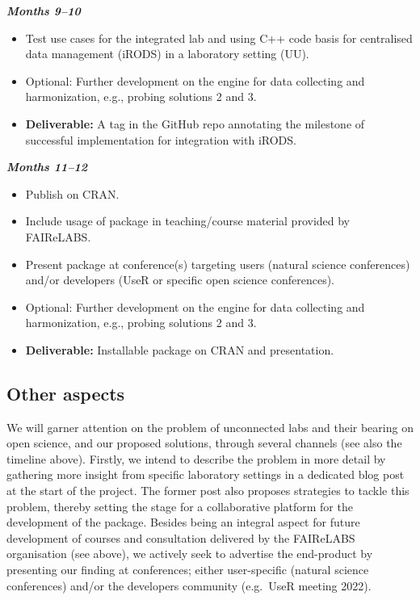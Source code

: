 \documentclass[]{article}
\providecommand{\tightlist}{%
  \setlength{\itemsep}{0pt}\setlength{\parskip}{0pt}}
\begin{document}
\textbf{\emph{Months 9--10}}

\begin{itemize}
\tightlist
\item
  Test use cases for the integrated lab and using C++ code basis for centralised data management (iRODS) in a laboratory setting (UU).
\item
  Optional: Further development on the engine for data collecting and harmonization, e.g., probing solutions 2 and 3.
\item
  \textbf{Deliverable:} A tag in the GitHub repo annotating the milestone of successful implementation for integration with iRODS.
\end{itemize}

\textbf{\emph{Months 11--12}}

\begin{itemize}
\tightlist
\item
  Publish on CRAN.
\item
  Include usage of package in teaching/course material provided by FAIReLABS.
\item
  Present package at conference(s) targeting users (natural science conferences) and/or developers (UseR or specific open science conferences).
\item
  Optional: Further development on the engine for data collecting and harmonization, e.g., probing solutions 2 and 3.
\item
  \textbf{Deliverable:} Installable package on CRAN and presentation.
\end{itemize}

\hypertarget{other-aspects}{%
\subsection{Other aspects}\label{other-aspects}}

We will garner attention on the problem of unconnected labs and their bearing on open science, and our proposed solutions, through several channels (see also the timeline above). Firstly, we intend to describe the problem in more detail by gathering more insight from specific laboratory settings in a dedicated blog post at the start of the project. The former post also proposes strategies to tackle this problem, thereby setting the stage for a collaborative platform for the development of the package. Besides being an integral aspect for future development of courses and consultation delivered by the FAIReLABS organisation (see above), we actively seek to advertise the end-product by presenting our finding at conferences; either user-specific (natural science conferences) and/or the developers community (e.g.~UseR meeting 2022).
\end{document}
